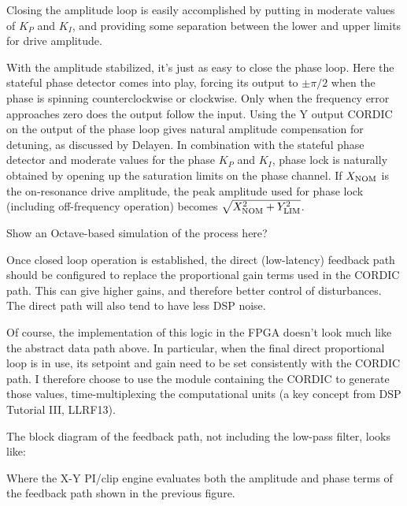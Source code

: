 Closing the amplitude loop is easily accomplished by putting in moderate
values of $K_P$ and $K_I$, and providing some separation between the lower
and upper limits for drive amplitude.

With the amplitude stabilized, it's just as easy to close the phase loop.
Here the stateful phase detector comes into play, forcing its output to
$\pm\pi/2$ when the phase is spinning counterclockwise or clockwise.
Only when the frequency error approaches zero does the output follow the input.
Using the Y output CORDIC on the output of the phase loop gives natural
amplitude compensation for detuning, as discussed by Delayen.  In combination
with the stateful phase detector and moderate values for the phase $K_P$ and
$K_I$, phase lock is naturally obtained by opening up the saturation limits
on the phase channel.  If $X_{\rm NOM}$ is the on-resonance drive amplitude,
the peak amplitude used for phase lock (including off-frequency operation)
becomes $\sqrt{X_{\rm NOM}^2+Y_{\rm LIM}^2}$.

Show an Octave-based simulation of the process here?

Once closed loop operation is established, the direct (low-latency) feedback
path should be configured to replace the proportional gain terms used in the
CORDIC path.  This can give higher gains, and therefore better control of
disturbances.  The direct path will also tend to have less DSP noise.


Of course, the implementation of this logic in the FPGA doesn't look much
like the abstract data path above.  In particular, when the final direct
proportional loop is in use, its setpoint and gain need to be set consistently
with the CORDIC path.  I therefore choose to use the module containing the
CORDIC to generate those values, time-multiplexing the computational units
(a key concept from DSP Tutorial III, LLRF13).

The block diagram of the feedback path, not including the low-pass filter,
looks like:


Where the X-Y PI/clip engine evaluates both the amplitude and phase terms
of the feedback path shown in the previous figure.

